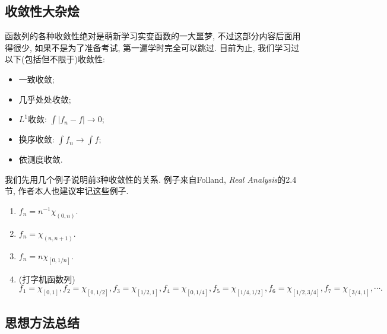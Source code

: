 \subsection{收敛性大杂烩}
函数列的各种收敛性绝对是萌新学习实变函数的一大噩梦, 不过这部分内容后面用得很少, 如果不是为了准备考试, 第一遍学时完全可以跳过. 目前为止, 我们学习过以下(包括但不限于)收敛性:
\begin{itemize}
    \item 一致收敛;
    \item 几乎处处收敛;
    \item $L^1$收敛: $\int |f_n-f| \to 0$;
    \item 换序收敛: $\int f_n \to \int f$;
    \item 依测度收敛.
\end{itemize}
我们先用几个例子说明前3种收敛性的关系. 例子来自Folland, \textit{Real Analysis}的2.4节, 作者本人也建议牢记这些例子.
\begin{enumerate}
    \item $f_n = n^{-1}\chi_{(0,n)}$.
    \item $f_n = \chi_{(n,n+1)}$.
    \item $f_n = n\chi_{[0, 1/n]}$.
    \item (打字机函数列) $f_1=\chi_{[0,1]}, f_2=\chi_{[0,1/2]}, 
    f_3=\chi_{[1/2,1]}, f_4=\chi_{[0,1/4]}, f_5=\chi_{[1/4,1/2]}, 
    f_6=\chi_{[1/2,3/4]}, f_7=\chi_{[3/4,1]}, \cdots. $
\end{enumerate}

\subsection{思想方法总结}




